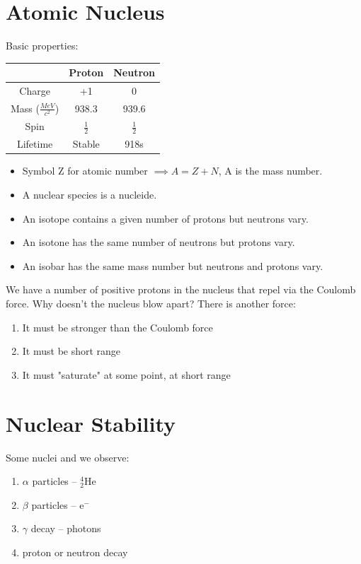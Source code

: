 \documentclass[a4paper, 11pt, normalem]{report}
\begin{document}
\section{Atomic Nucleus}
Basic properties:
\begin{table}[H]
    \centering
    \begin{tabular}{|c|c|c|}
        \hline
        \rowcolor{lightgray} & Proton & Neutron   \\
        \hline
        Charge & +1     & 0         \\
        Mass ($\frac{MeV}{c^{2}}$)  & 938.3  & 939.6   \\
        Spin   & $\frac{1}{2}$ & $\frac{1}{2}$ \\
        Lifetime & Stable & 918s\\
        \hline
    \end{tabular}
\end{table}
\begin{itemize}
    \item Symbol Z for atomic number $\implies A = Z + N$, A is the mass number.
    \item A nuclear species is a nucleide.
    \item An isotope contains a given number of protons but neutrons vary.
    \item An isotone has the same number of neutrons but protons vary.
    \item An isobar has the same mass number but neutrons and protons vary. 
\end{itemize}
We have a number of positive protons in the nucleus that repel via the Coulomb force.
Why doesn't the nucleus blow apart?
There is another force:
\begin{enumerate}
    \item It must be stronger than the Coulomb force
    \item It must be short range
    \item It must "saturate" at some point, at short range
\end{enumerate}

\section{Nuclear Stability}
Some nuclei and we observe:
\begin{enumerate}
    \item $\alpha$ particles -- $_{2}^{4}$He
    \item $\beta$ particles -- e$^{-}$
    \item $\gamma$ decay -- photons
    \item proton or neutron decay
\end{enumerate}
\end{document}
